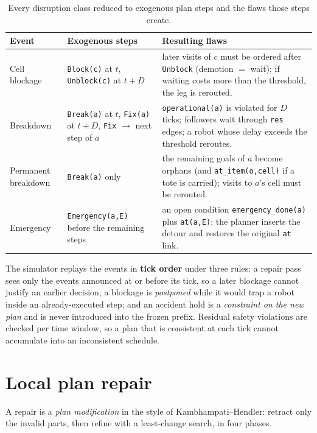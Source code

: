 \documentclass[10pt,a4paper]{article}
\newcommand{\code}[1]{\texttt{#1}}
\begin{document}
\begin{table}[H]
\centering
\small
\begin{tabularx}{\textwidth}{@{}l l X@{}}
\toprule
\textbf{Event} & \textbf{Exogenous steps} & \textbf{Resulting flaws}\\
\midrule
Cell blockage & \code{Block(c)} at $t$, \code{Unblock(c)} at $t\!+\!D$ &
  later visits of $c$ must be ordered after \code{Unblock} (demotion $=$
  wait); if waiting costs more than the threshold, the leg is rerouted.\\
Breakdown & \code{Break(a)} at $t$, \code{Fix(a)} at $t\!+\!D$, \code{Fix}
  $\to$ next step of $a$ &
  \code{operational(a)} is violated for $D$ ticks; followers wait through
  \code{res} edges; a robot whose delay exceeds the threshold reroutes.\\
Permanent breakdown & \code{Break(a)} only &
  the remaining goals of $a$ become orphans (and \code{at\_item(o,cell)} if a
  tote is carried); visits to $a$'s cell must be rerouted.\\
Emergency & \code{Emergency(a,E)} before the remaining steps &
  an open condition \code{emergency\_done(a)} plus \code{at(a,E)}: the
  planner inserts the detour and restores the original \code{at} link.\\
\bottomrule
\end{tabularx}
\caption{Every disruption class reduced to exogenous plan steps and the flaws
those steps create.}
\label{tab:events}
\end{table}

The simulator replays the events in \textbf{tick order} under three rules: a
repair pass sees only the events announced at or before its tick, so a later
blockage cannot justify an earlier decision; a blockage is \emph{postponed}
while it would trap a robot inside an already-executed step; and an accident
hold is a \emph{constraint on the new plan} and is never introduced into the
frozen prefix.  Residual safety violations are checked per time window, so a
plan that is consistent at each tick cannot accumulate into an inconsistent
schedule.
\section{Local plan repair}\label{sec:repair}

A repair is a \emph{plan modification} in the style of
Kambhampati--Hendler: retract only the invalid parts, then refine with a
least-change search, in four phases.
\end{document}
